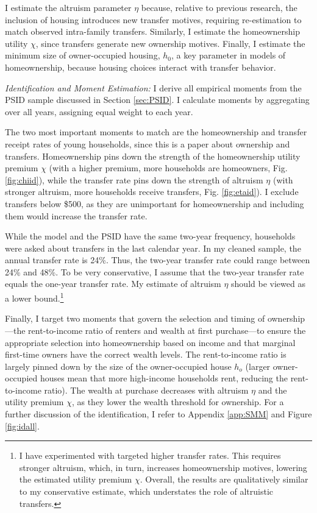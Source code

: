 \documentclass[12pt]{article}
\begin{document}
I estimate the altruism parameter $\eta$ because, relative to previous research, the inclusion of housing introduces new transfer motives, requiring re-estimation to match observed intra-family transfers. Similarly, I estimate the homeownership utility $\chi$, since transfers generate new ownership motives. Finally, I estimate the minimum size of owner-occupied housing, $h_0$, a key parameter in models of homeownership, because housing choices interact with transfer behavior.

\textit{Identification and Moment Estimation:}
I derive all empirical moments from the PSID sample discussed in Section \ref{sec:PSID}. I calculate moments by aggregating over all years, assigning equal weight to each year.

The two most important moments to match are the homeownership and transfer receipt rates of young households, since this is a paper about ownership and transfers. Homeownership pins down the strength of the homeownership utility premium $\chi$ (with a higher premium, more households are homeowners, Fig. \ref{fig:chiid}), while the transfer rate pins down the strength of altruism $\eta$ (with stronger altruism, more households receive transfers, Fig. \ref{fig:etaid}). I exclude transfers below \$500, as they are unimportant for homeownership and including them would increase the transfer rate.

While the model and the PSID have the same two-year frequency, households were asked about transfers in the last calendar year. In my cleaned sample, the annual transfer rate is 24\%. Thus, the two-year transfer rate could range between 24\% and 48\%. To be very conservative, I assume that the two-year transfer rate equals the one-year transfer rate. My estimate of altruism $\eta$ should be viewed as a lower bound.\footnote{I have experimented with targeted higher transfer rates. This requires stronger altruism, which, in turn, increases homeownership motives, lowering the estimated utility premium $\chi$. Overall, the results are qualitatively similar to my conservative estimate, which understates the role of altruistic transfers.}

Finally, I target two moments that govern the selection and timing of ownership---the rent-to-income ratio of renters and wealth at first purchase---to ensure the appropriate selection into homeownership based on income and that marginal first-time owners have the correct wealth levels. The rent-to-income ratio is largely pinned down by the size of the owner-occupied house $h_o$ (larger owner-occupied houses mean that more high-income households rent, reducing the rent-to-income ratio). The wealth at purchase decreases with altruism $\eta$ and the utility premium $\chi$, as they lower the wealth threshold for ownership. For a further discussion of the identification, I refer to Appendix \ref{app:SMM} and Figure \ref{fig:idall}.
\end{document}
